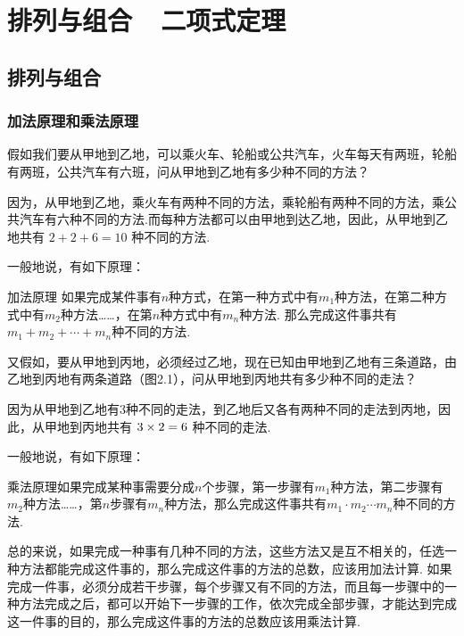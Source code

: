 \chapter{排列与组合~~二项式定理}
\section{排列与组合}
\subsection{加法原理和乘法原理}
假如我们要从甲地到乙地，可以乘火车、轮船或公共汽车，火车每天有两班，轮船有两班，公共汽车有六班，问从甲地到乙地有多少种不同的方法？

因为，从甲地到乙地，乘火车有两种不同的方法，乘轮船有两种不同的方法，乘公共汽车有六种不同的方法.而每种方法都可以由甲地到达乙地，因此，从甲地到乙地共有
$2+2+6=10$
种不同的方法.

一般地说，有如下原理：
\begin{blk}{加法原理}
如果完成某件事有$n$种方式，在第一种方式中有$m_1$种方法，在第二种方式中有$m_2$种方法……，在第$n$种方式中有$m_n$种方法. 那么完成这件事共有$m_1+m_2+\cdots+m_n$种不同的方法.
\end{blk}

又假如，要从甲地到丙地，必须经过乙地，现在已知由甲地到乙地有三条道路，由乙地到丙地有两条道路（图2.1），问从甲地到丙地共有多少种不同的走法？
\begin{figure}[htp]
    \centering
{}
    \caption{}
\end{figure}

因为从甲地到乙地有3种不同的走法，到乙地后又各有两种不同的走法到丙地，因此，从甲地到丙地共有
$3\times2=6$
种不同的走法.

一般地说，有如下原理：

\begin{blk}
    {乘法原理}如果完成某种事需要分成$n$个步骤，第一步骤有$m_1$种方法，第二步骤有$m_2$种方法……，第$n$步骤有$m_n$种方法，那么完成这件事共有$m_1\cdot m_2\cdots m_n$种不同的方法.
\end{blk}

总的来说，如果完成一种事有几种不同的方法，这些方法又是互不相关的，任选一种方法都能完成这件事的，那么完成这件事的方法的总数，应该用加法计算. 如果完成一件事，必须分成若干步骤，每个步骤又有不同的方法，而且每一步骤中的一种方法完成之后，都可以开始下一步骤的工作，依次完成全部步骤，才能达到完成这一件事的目的，那么完成这件事的方法的总数应该用乘法计算.

